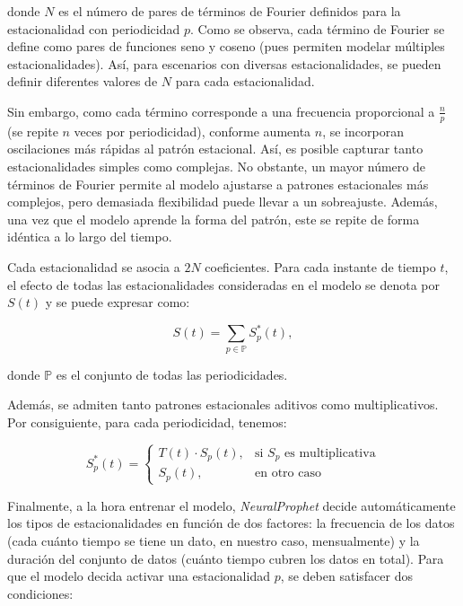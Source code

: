 \documentclass[12pt,twoside]{article}
\begin{document}
donde $N$ es el número de pares de términos de Fourier definidos para la estacionalidad con periodicidad $p$. Como se observa, cada término de Fourier se define como pares de funciones seno y coseno (pues permiten modelar múltiples estacionalidades). Así, para escenarios con diversas estacionalidades, se pueden definir diferentes valores de $N$ para cada estacionalidad.

Sin embargo, como cada término corresponde a una frecuencia proporcional a $\frac{n}{p}$ (se repite $n$ veces por periodicidad), conforme aumenta $n$, se incorporan oscilaciones más rápidas al patrón estacional. Así, es posible capturar tanto estacionalidades simples como complejas. No obstante, un mayor número de términos de Fourier permite al modelo ajustarse a patrones estacionales más complejos, pero demasiada flexibilidad puede llevar a un sobreajuste. Además, una vez que el modelo aprende la forma del patrón, este se repite de forma idéntica a lo largo del tiempo.

Cada estacionalidad se asocia a $2N$ coeficientes. Para cada instante de tiempo $t$, el efecto de todas las estacionalidades consideradas en el modelo se denota por $S(t)$ y se puede expresar como:

\begin{equation}
S(t) = \sum_{p \in \mathbb{P}}S_p^*(t),
\end{equation}

donde $\mathbb{P}$ es el conjunto de todas las periodicidades.

Además, se admiten tanto patrones estacionales aditivos como multiplicativos. Por consiguiente, para cada periodicidad, tenemos:

\begin{equation}
S_p^*(t) = 
\begin{cases}
T(t) \cdot S_p(t), & \text{si } S_p \text{ es multiplicativa} \\
S_p(t), & \text{en otro caso}
\end{cases}
\end{equation}

Finalmente, a la hora entrenar el modelo, \textit{NeuralProphet} decide automáticamente los tipos de estacionalidades en función de dos factores: la frecuencia de los datos (cada cuánto tiempo se tiene un dato, en nuestro caso, mensualmente) y la duración del conjunto de datos (cuánto tiempo cubren los datos en total). Para que el modelo decida activar una estacionalidad $p$, se deben satisfacer dos condiciones:
\end{document}
